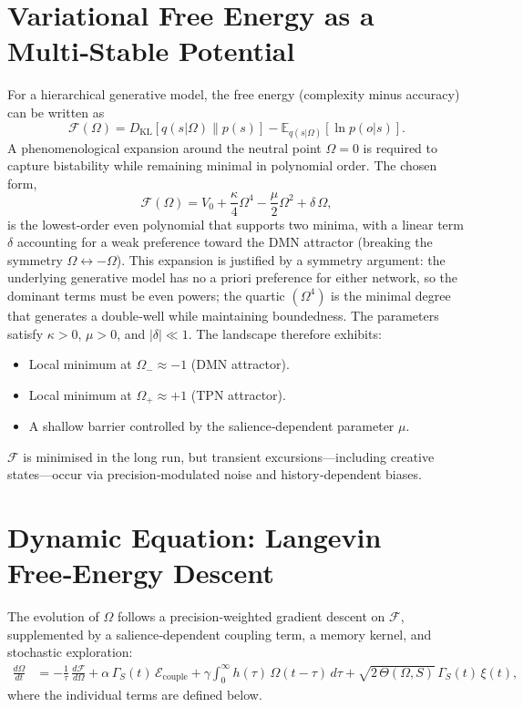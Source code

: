 \documentclass[11pt]{article}
\newcommand{\E}{\mathbb{E}}
\begin{document}
\section{Variational Free Energy as a Multi‑Stable Potential}
For a hierarchical generative model, the free energy (complexity minus accuracy) can be written as
\begin{equation}
\mathcal{F}(\Omega) = D_{\mathrm{KL}}[q(s|\Omega)\|p(s)] - \E_{q(s|\Omega)}[\ln p(o|s)].
\end{equation}
A phenomenological expansion around the neutral point $\Omega=0$ is required to capture bistability while remaining minimal in polynomial order. The chosen form,
\begin{equation}\label{eq:F}
\mathcal{F}(\Omega) = V_0 + \frac{\kappa}{4}\Omega^4 - \frac{\mu}{2}\Omega^2 + \delta\,\Omega,
\end{equation}
is the lowest‑order even polynomial that supports two minima, with a linear term $\delta$ accounting for a weak preference toward the DMN attractor (breaking the symmetry $\Omega\leftrightarrow-\Omega$). This expansion is justified by a symmetry argument: the underlying generative model has no a priori preference for either network, so the dominant terms must be even powers; the quartic $(\Omega^4)$ is the minimal degree that generates a double‑well while maintaining boundedness. The parameters satisfy $\kappa>0$, $\mu>0$, and $|\delta|\ll 1$. The landscape therefore exhibits:
\begin{itemize}
    \item Local minimum at $\Omega_{-} \approx -1$ (DMN attractor).
    \item Local minimum at $\Omega_{+} \approx +1$ (TPN attractor).
    \item A shallow barrier controlled by the salience‑dependent parameter $\mu$.
\end{itemize}
$\mathcal{F}$ is minimised in the long run, but transient excursions---including creative states---occur via precision‑modulated noise and history‑dependent biases.

\section{Dynamic Equation: Langevin Free‑Energy Descent}
The evolution of $\Omega$ follows a precision‑weighted gradient descent on $\mathcal{F}$, supplemented by a salience‑dependent coupling term, a memory kernel, and stochastic exploration:
\begin{equation}\label{eq:Langevin}
\boxed{
\begin{aligned}
\frac{d\Omega}{dt} 
&= -\frac{1}{\tau}\,\frac{d\mathcal{F}}{d\Omega}
   + \alpha\,\Gamma_S(t)\,\mathcal{E}_{\text{couple}}
   + \gamma\int_{0}^{\infty} h(\tau)\,\Omega(t-\tau)\,d\tau
   + \sqrt{2\,\Theta(\Omega,S)}\,\Gamma_S(t)\,\xi(t),
\end{aligned}}
\end{equation}
where the individual terms are defined below.
\end{document}

